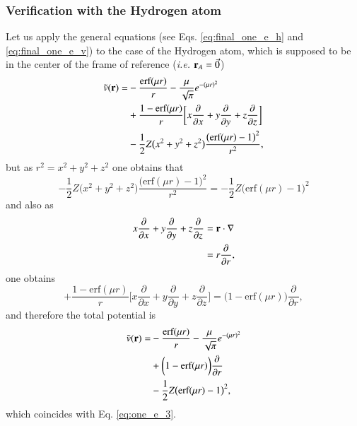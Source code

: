 \documentclass[aip,jcp,reprint,noshowkeys,superscriptaddress]{revtex4-1}
\newcommand{\deriv}[3]{\frac{\partial^{#3} #1}{\partial {#2}^{#3}}}
\begin{document}
\subsubsection{Verification with the Hydrogen atom}
Let us apply the general equations (see Eqs. \eqref{eq:final_one_e_h} and \eqref{eq:final_one_e_v}) to the case of the Hydrogen atom, which is supposed to be in the center of the frame of reference (\textit{i.e.} ${\bf r}_A = \vec{0}$)
\begin{equation}
 \begin{aligned}
  \tilde{v}({\bf r}) = & -\frac{\text{erf}(\mu r)}{r} - \frac{\mu}{\sqrt{\pi}} e^{-(\mu r)^2} \\
           &+  \frac{1 - \text{erf}(\mu r)}{r} \bigg[ x \deriv{}{x}{} + y \deriv{}{y}{} + z \deriv{}{z}{}\bigg] \\
           &- \frac{1}{2}Z \big(x^2 + y^2 + z^2 \big)  \frac{\big(\text{erf}(\mu r) - 1\big)^2}{r^2},
 \end{aligned}
\end{equation}
but as $r^2 = x^2+y^2+z^2$ one obtains that 
\begin{equation}
 - \frac{1}{2}Z \big(x^2 + y^2 + z^2 \big)  \frac{\big(\text{erf}(\mu r) - 1\big)^2}{r^2} = - \frac{1}{2}Z\big(\text{erf}(\mu r) - 1\big)^2
\end{equation}
and also as 
\begin{equation}
 \begin{aligned}
 x \deriv{}{x}{} + y \deriv{}{y}{} + z \deriv{}{z}{} & = {\bf r} \cdot \nabla \\
                                                     & = r \deriv{}{r}{},
 \end{aligned}
\end{equation}
one obtains 
\begin{equation}
           +  \frac{1 - \text{erf}(\mu r)}{r} \bigg[ x \deriv{}{x}{} + y \deriv{}{y}{} + z \deriv{}{z}{}\bigg] = \bigg(1 - \text{erf}(\mu r)\bigg)\deriv{}{r}{},
\end{equation}
and therefore the total potential is 
\begin{equation}
 \begin{aligned}
  \tilde{v}({\bf r}) = & -\frac{\text{erf}(\mu r)}{r} - \frac{\mu}{\sqrt{\pi}} e^{-(\mu r)^2} \\
           &+  \bigg(1 - \text{erf}(\mu r)\bigg)\deriv{}{r}{} \\
           &- \frac{1}{2}Z\big(\text{erf}(\mu r) - 1\big)^2,
 \end{aligned}
\end{equation}
which coincides with Eq. \eqref{eq:one_e_3}. 

\end{document}
